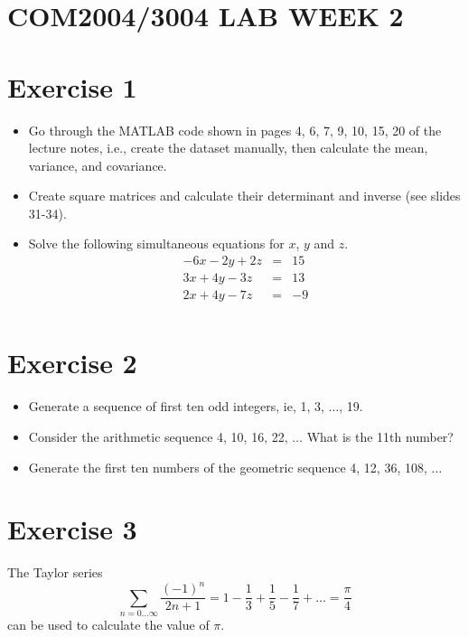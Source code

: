\documentclass{article}
\begin{document}
 
\section*{COM2004/3004 LAB WEEK 2}

\section*{Exercise 1}

\begin{itemize}
\item Go through the MATLAB code shown in pages 4, 6, 7, 9, 10, 15, 20 of the lecture notes, i.e.,  create the dataset manually, then calculate the mean, variance, and covariance.
\item Create square matrices and calculate their determinant and inverse (see slides 31-34).
\item Solve the following simultaneous equations for $x$, $y$ and $z$.
%
\begin{eqnarray*}
-6x - 2y + 2z & = & 15 \\
3x + 4y - 3z & = & 13 \\
2x + 4y - 7z & = & -9 \\
\end{eqnarray*}

\end{itemize}

\section*{Exercise 2}

\begin{itemize}
\item Generate a sequence of first ten odd integers, ie, 1, 3, $\dots$, 19.
\item Consider the arithmetic sequence 4, 10, 16, 22, $\dots$ What is the 11th number?
\item Generate the first ten numbers of the geometric sequence  4, 12, 36, 108, $\dots$
\end{itemize}

\section*{Exercise 3}

The Taylor series 
%
\begin{equation*}
\sum_{n=0...\infty} \frac{(-1)^n}{2n+1} = 1 - \frac{1}{3} + \frac{1}{5} - \frac{1}{7} + \dots = \frac{\pi}{4}
\end{equation*}
%
can be used to calculate the value of $\pi$.
\end{document}
